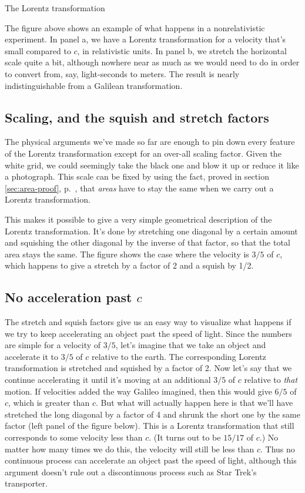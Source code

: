 \begin{section}{The Lorentz transformation}



The figure above shows an example of what happens in a nonrelativistic experiment. In panel a,
we have a Lorentz transformation for a velocity that's small compared to $c$, in relativistic units.
In panel b, we stretch the horizontal scale quite a bit, although nowhere near as much as we would
need to do in order to convert from, say, light-seconds to meters. The result is nearly indistinguishable
from a Galilean transformation.

\section[Scale, squish, stretch]{Scaling, and the squish and stretch factors}\label{sec:stretch}

The physical arguments we've made so far are enough to pin down every feature of the Lorentz transformation
except for an over-all scaling factor. Given the white grid, we could seemingly take the black
one and blow it up or reduce it
like a photograph. This scale can be fixed by using the fact, proved in section \ref{sec:area-proof},
p.~\pageref{sec:area-proof}, that \emph{areas} have to stay the same when we carry out a Lorentz transformation.


This makes it possible to give a very simple geometrical description of the Lorentz transformation.
It's done by stretching one diagonal by a certain amount and squishing the other diagonal by the inverse
of that factor, so that the total area stays the same. The figure shows the case where the velocity is $3/5$ of
$c$, which happens to give a stretch by a factor of 2 and a squish by 1/2.

\section{No acceleration past $c$}

The stretch and squish factors give us an easy way to visualize what happens if we try to keep accelerating
an object past the speed of light. Since the numbers are simple for a velocity of $3/5$, let's imagine that
we take an object and accelerate it to $3/5$ of $c$ relative to the earth. The corresponding Lorentz transformation
is stretched and squished by a factor of 2. Now let's say that we continue accelerating it until it's moving at
an additional $3/5$ of $c$ relative to \emph{that} motion. If velocities added the way Galileo imagined, then this would
give $6/5$ of $c$, which is greater than $c$. But what will actually happen here is that we'll have stretched the
long diagonal by a factor of 4 and shrunk the short one by the same factor (left panel of the figure below).
This is a Lorentz transformation that
still corresponds to some velocity less than $c$. (It turns out to be $15/17$ of $c$.)
No matter how many times we do this, the velocity will still be
less than $c$. Thus no continuous process can accelerate an object past the speed of light, although this
argument doesn't rule out a discontinuous process such as Star Trek's transporter.


\end{section}
